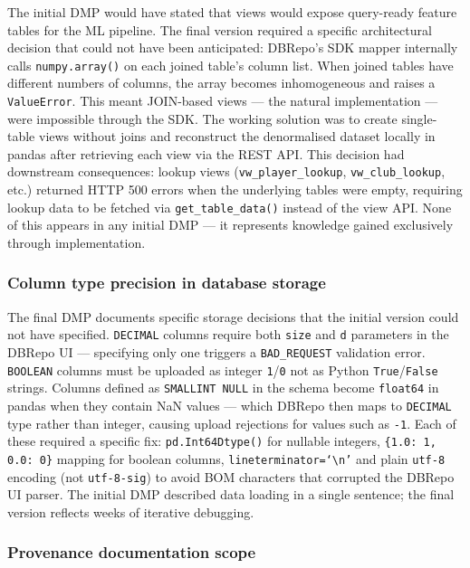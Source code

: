 The initial DMP would have stated that views would expose query-ready feature tables for
the ML pipeline. The final version required a specific architectural decision that could
not have been anticipated: DBRepo's SDK mapper internally calls \texttt{numpy.array()}
on each joined table's column list. When joined tables have different numbers of
columns, the array becomes inhomogeneous and raises a \texttt{ValueError}. This meant
JOIN-based views --- the natural implementation --- were impossible through the SDK. The
working solution was to create single-table views without joins and reconstruct the
denormalised dataset locally in pandas after retrieving each view via the REST API. This
decision had downstream consequences: lookup views (\texttt{vw\_player\_lookup},
\texttt{vw\_club\_lookup}, etc.) returned HTTP 500 errors when the underlying tables
were empty, requiring lookup data to be fetched via \texttt{get\_table\_data()} instead
of the view API. None of this appears in any initial DMP --- it represents knowledge
gained exclusively through implementation.

\subsubsection*{Column type precision in database storage}

The final DMP documents specific storage decisions that the initial version could not
have specified. \texttt{DECIMAL} columns require both \texttt{size} and \texttt{d}
parameters in the DBRepo UI --- specifying only one triggers a \texttt{BAD\_REQUEST}
validation error. \texttt{BOOLEAN} columns must be uploaded as integer \texttt{1}/\texttt{0}
not as Python \texttt{True}/\texttt{False} strings. Columns defined as
\texttt{SMALLINT NULL} in the schema become \texttt{float64} in pandas when they
contain NaN values --- which DBRepo then maps to \texttt{DECIMAL} type rather than
integer, causing upload rejections for values such as \texttt{-1}. Each of these
required a specific fix: \texttt{pd.Int64Dtype()} for nullable integers,
\texttt{\{1.0: 1, 0.0: 0\}} mapping for boolean columns, \texttt{lineterminator=`\textbackslash n'}
and plain \texttt{utf-8} encoding (not \texttt{utf-8-sig}) to avoid BOM characters that
corrupted the DBRepo UI parser. The initial DMP described data loading in a single
sentence; the final version reflects weeks of iterative debugging.

\subsubsection*{Provenance documentation scope}

